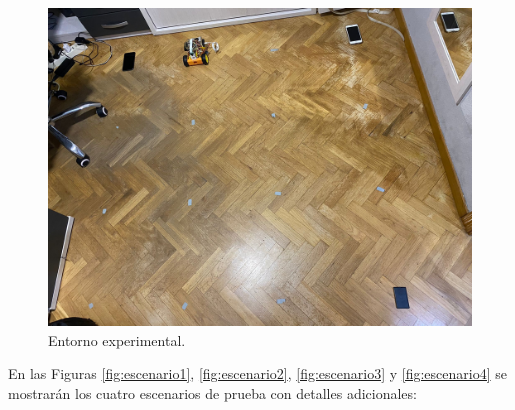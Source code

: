 \begin{figure}[H]
  \centering
  \includegraphics[scale=0.15]{figs/escenario} %
  \caption{ Entorno experimental.}
  \label{fig:escenario}
\end{figure} 


En las Figuras \ref{fig:escenario1}, \ref{fig:escenario2}, \ref{fig:escenario3} y \ref{fig:escenario4} se mostrarán los cuatro escenarios de prueba con detalles adicionales:




